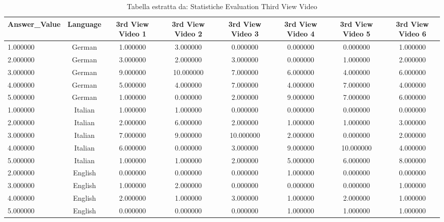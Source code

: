 \begin{table}[htbp]
\caption{Tabella estratta da: Statistiche Evaluation Third View Video}
\label{tab:statistiche_evaluation third view video}
\begin{tabular}{lccccccc}
\toprule
Answer\_Value & Language & 3rd View Video 1 & 3rd View Video 2 & 3rd View Video 3 & 3rd View Video 4 & 3rd View Video 5 & 3rd View Video 6 \\
\midrule
1.000000 & German & 1.000000 & 3.000000 & 0.000000 & 0.000000 & 0.000000 & 1.000000 \\
2.000000 & German & 3.000000 & 2.000000 & 3.000000 & 0.000000 & 1.000000 & 2.000000 \\
3.000000 & German & 9.000000 & 10.000000 & 7.000000 & 6.000000 & 4.000000 & 6.000000 \\
4.000000 & German & 5.000000 & 4.000000 & 7.000000 & 4.000000 & 7.000000 & 4.000000 \\
5.000000 & German & 1.000000 & 0.000000 & 2.000000 & 9.000000 & 7.000000 & 6.000000 \\
1.000000 & Italian & 1.000000 & 1.000000 & 0.000000 & 0.000000 & 0.000000 & 0.000000 \\
2.000000 & Italian & 2.000000 & 6.000000 & 2.000000 & 1.000000 & 1.000000 & 3.000000 \\
3.000000 & Italian & 7.000000 & 9.000000 & 10.000000 & 2.000000 & 0.000000 & 2.000000 \\
4.000000 & Italian & 6.000000 & 0.000000 & 3.000000 & 9.000000 & 10.000000 & 4.000000 \\
5.000000 & Italian & 1.000000 & 1.000000 & 2.000000 & 5.000000 & 6.000000 & 8.000000 \\
2.000000 & English & 0.000000 & 0.000000 & 0.000000 & 1.000000 & 0.000000 & 0.000000 \\
3.000000 & English & 1.000000 & 2.000000 & 0.000000 & 0.000000 & 0.000000 & 1.000000 \\
4.000000 & English & 2.000000 & 1.000000 & 3.000000 & 1.000000 & 2.000000 & 1.000000 \\
5.000000 & English & 0.000000 & 0.000000 & 0.000000 & 1.000000 & 1.000000 & 1.000000 \\
\bottomrule
\end{tabular}
\end{table}
